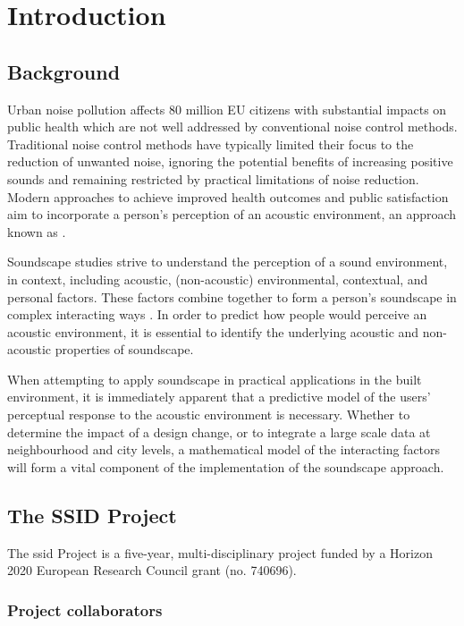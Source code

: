 \chapter{Introduction}
\label{ch:intro}

\section{Background}
Urban noise pollution affects 80 million EU citizens with substantial impacts on public health which are not well addressed by conventional noise control methods. Traditional noise control methods have typically limited their focus to the reduction of unwanted noise, ignoring the potential benefits of increasing positive sounds and remaining restricted by practical limitations of noise reduction. Modern approaches to achieve improved health outcomes and public satisfaction aim to incorporate a person's perception of an acoustic environment, an approach known as .

Soundscape studies strive to understand the perception of a sound environment, in context, including acoustic, (non-acoustic) environmental, contextual, and personal factors. These factors combine together to form a person's soundscape in complex interacting ways \citep{Berglund2006Tool}. In order to predict how people would perceive an acoustic environment, it is essential to identify the underlying acoustic and non-acoustic properties of soundscape.

When attempting to apply soundscape in practical applications in the built environment, it is immediately apparent that a predictive model of the users' perceptual response to the acoustic environment is necessary. Whether to determine the impact of a design change, or to integrate a large scale data at neighbourhood and city levels, a mathematical model of the interacting factors will form a vital component of the implementation of the soundscape approach. 

\section{The SSID Project}
The \gls{ssid} Project is a five-year, multi-disciplinary project funded by a Horizon 2020 European Research Council grant (no. 740696).

\subsection{Project collaborators}

